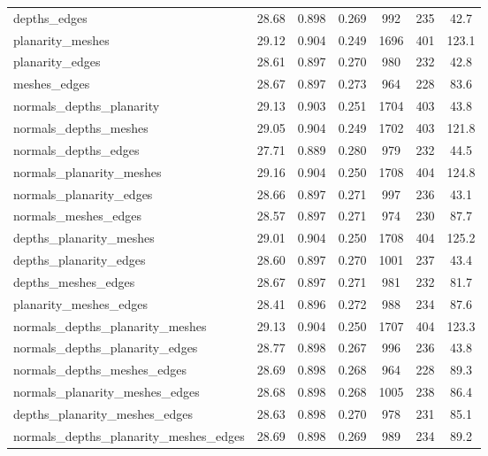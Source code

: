 \begin{table}[h]
{\begin{tabular}{@{}l|ccc|ccc@{}}
depths\_edges & 28.68 & 0.898 & 0.269 & 992 & 235 & \cellcolor{green!70}42.7 \\
planarity\_meshes & 29.12 & \cellcolor{green!70}0.904 & \cellcolor{green!70}0.249 & 1696 & 401 & 123.1 \\
planarity\_edges & 28.61 & 0.897 & 0.270 & 980 & 232 & \cellcolor{green!40}42.8 \\
meshes\_edges & 28.67 & 0.897 & 0.273 & \cellcolor{green!70}964 & \cellcolor{green!70}228 & 83.6 \\
\midrule
normals\_depths\_planarity & \cellcolor{green!20}29.13 & \cellcolor{green!40}0.903 & 0.251 & 1704 & \cellcolor{green!20}403 & 43.8 \\
normals\_depths\_meshes & 29.05 & \cellcolor{green!70}0.904 & \cellcolor{green!70}0.249 & 1702 & \cellcolor{green!20}403 & 121.8 \\
normals\_depths\_edges & 27.71 & 0.889 & 0.280 & \cellcolor{green!40}979 & \cellcolor{green!40}232 & 44.5 \\
normals\_planarity\_meshes & \cellcolor{green!70}29.16 & \cellcolor{green!70}0.904 & \cellcolor{green!40}0.250 & 1708 & 404 & 124.8 \\
normals\_planarity\_edges & 28.66 & 0.897 & 0.271 & 997 & 236 & \cellcolor{green!20}43.1 \\
normals\_meshes\_edges & 28.57 & 0.897 & 0.271 & \cellcolor{green!40}974 & \cellcolor{green!40}230 & 87.7 \\
depths\_planarity\_meshes & 29.01 & \cellcolor{green!70}0.904 & \cellcolor{green!40}0.250 & 1708 & 404 & 125.2 \\
depths\_planarity\_edges & 28.60 & 0.897 & 0.270 & 1001 & 237 & 43.4 \\
depths\_meshes\_edges & 28.67 & 0.897 & 0.271 & 981 & \cellcolor{green!40}232 & 81.7 \\
planarity\_meshes\_edges & 28.41 & 0.896 & 0.272 & 988 & \cellcolor{green!20}234 & 87.6 \\
\midrule
normals\_depths\_planarity\_meshes & \cellcolor{green!20}29.13 & \cellcolor{green!70}0.904 & \cellcolor{green!40}0.250 & 1707 & 404 & 123.3 \\
normals\_depths\_planarity\_edges & 28.77 & 0.898 & 0.267 & 996 & 236 & 43.8 \\
normals\_depths\_meshes\_edges & 28.69 & 0.898 & 0.268 & \cellcolor{green!70}964 & \cellcolor{green!70}228 & 89.3 \\
normals\_planarity\_meshes\_edges & 28.68 & 0.898 & 0.268 & 1005 & 238 & 86.4 \\
depths\_planarity\_meshes\_edges & 28.63 & 0.898 & 0.270 & 978 & \cellcolor{green!20}231 & 85.1 \\
\midrule
normals\_depths\_planarity\_meshes\_edges & 28.69 & 0.898 & 0.269 & 989 & \cellcolor{green!20}234 & 89.2 \\
\bottomrule
\end{tabular}%
}
\end{table}

